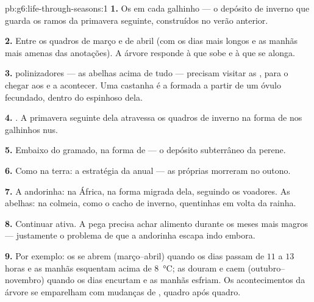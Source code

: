 \begin{solution}{pb:g6:life-through-seasons:1}
\textbf{1.} Os  em cada galhinho --- o depósito de inverno que
guarda os ramos da primavera seguinte, construídos no verão anterior.

\textbf{2.} Entre os quadros de março e de abril (com os dias mais
longos e as manhãs mais amenas das anotações). A árvore responde à
 que sobe e à  que se alonga.

\textbf{3.}  polinizadores --- as abelhas acima de tudo ---
precisam visitar as , para o  chegar aos  e a
 acontecer. Uma castanha é a  formada a partir de um
óvulo fecundado, dentro do  espinhoso dela.

\textbf{4.} . A primavera seguinte dela atravessa os
quadros de inverno na forma de  nos galhinhos nus.

\textbf{5.} Embaixo do gramado, na forma de  --- o depósito
subterrâneo da perene.

\textbf{6.} Como  na terra: a estratégia da anual --- as
próprias  morreram no outono.

\textbf{7.} A andorinha: na África, na forma migrada dela, seguindo
os  voadores. As abelhas: na colmeia, como o cacho de inverno,
quentinhas em volta da rainha.

\textbf{8.} Continuar ativa. A pega precisa achar alimento durante os
meses mais magros --- justamente o problema de que a andorinha escapa
indo embora.

\textbf{9.} Por exemplo: os  se abrem (março--abril) quando os
dias passam de $11$ a $13$ horas e as manhãs esquentam acima de
\qty{8}{\degreeCelsius}; as  douram e caem
(outubro--novembro) quando os dias encurtam e as manhãs esfriam. Os
acontecimentos da árvore se emparelham com mudanças de ,
quadro após quadro.


\end{solution}
